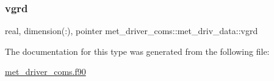 \subsubsection{\texorpdfstring{vgrd}{vgrd}}
{\footnotesize\ttfamily real, dimension(\+:), pointer met\+\_\+driver\+\_\+coms\+::met\+\_\+driv\+\_\+data\+::vgrd}



The documentation for this type was generated from the following file\+:\begin{DoxyCompactItemize}
\item 
\hyperlink{met__driver__coms_8f90}{met\+\_\+driver\+\_\+coms.\+f90}\end{DoxyCompactItemize}
